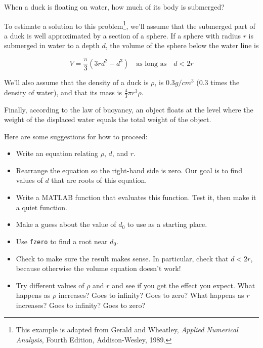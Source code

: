 \documentclass[
]{book}
\numberwithin{Answer}{chapter}
\numberwithin{Exercise}{chapter}
\begin{document}
\begin{ex}
\label{ex:duck}

When a duck is floating on water, how much of its body is submerged?


To estimate a solution to this problem\footnote{This example is adapted from Gerald and Wheatley,
{\em Applied Numerical Analysis}, Fourth Edition, Addison-Wesley,
1989.}, we'll assume that the submerged part of a duck is well approximated by a section of a sphere.
If a sphere with radius $r$ is submerged in water to a depth $d$, the
volume of the sphere below the water line is

\[ V = \frac{\pi}{3} (3r d^2 - d^3) \quad
\mbox{as long as} \quad d < 2 r  \]

We'll also assume that the density of a duck is $\rho$, is $0.3 g / cm^3$ (0.3 times the density of water), and that its mass is $\frac{4}{3} \pi r^3 \rho$.

Finally, according to the law of buoyancy, an object floats at the level where the weight of the displaced water equals the total weight of the object.


Here are some suggestions for how to proceed:

\begin{itemize}

\item Write an equation relating $\rho$, $d$, and $r$.

\item Rearrange the equation so the right-hand side is zero.
Our goal is to find values of $d$ that are roots of this equation.

\item Write a MATLAB function that evaluates this function.  Test it,
   then make it a quiet function.

\item Make a guess about the value of $d_0$ to use as a starting place.

\item Use {\tt fzero} to find a root near $d_0$.

\item Check to make sure the result makes sense.  In particular,
   check that $d < 2 r$, because otherwise the volume equation
   doesn't work!

\item Try different values of $\rho$ and $r$ and see if you get the
  effect you expect.  What happens as $\rho$ increases?  Goes to
  infinity?  Goes to zero?  What happens as $r$ increases?  Goes to
  infinity?  Goes to zero?

\end{itemize}

\end{ex}
\end{document}
